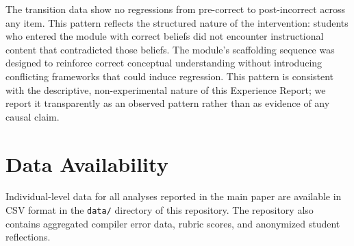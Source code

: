 \documentclass[11pt]{article}
\begin{document}
The transition data show no regressions from pre-correct to post-incorrect across any item. This pattern reflects the structured nature of the intervention: students who entered the module with correct beliefs did not encounter instructional content that contradicted those beliefs. The module's scaffolding sequence was designed to reinforce correct conceptual understanding without introducing conflicting frameworks that could induce regression. This pattern is consistent with the descriptive, non-experimental nature of this Experience Report; we report it transparently as an observed pattern rather than as evidence of any causal claim.

\section*{Data Availability}

Individual-level data for all analyses reported in the main paper are available in CSV format in the \texttt{data/} directory of this repository. The repository also contains aggregated compiler error data, rubric scores, and anonymized student reflections.
\end{document}

